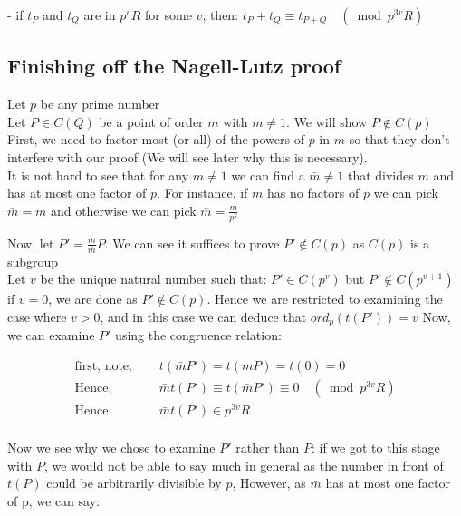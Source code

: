 \documentclass{article}
\begin{document}
- if $t_P$ and $t_Q$ are in $p^v R$ for some $v$, then: $t_P + t_Q  \equiv t_{P+Q} \quad (\bmod{p^{3v}R})$

\subsection{Finishing off the Nagell-Lutz proof}

Let $p$ be any prime number\\

Let $P \in C(Q)$ be a point of order $m$ with $m \neq 1$. We will show $P \notin C(p)$ \\

First, we need to factor most (or all) of the powers of $p$ in $m$ so that they don't interfere with our proof (We will see later why this is necessary).\\

It is not hard to see that for any $m \neq 1$ we can find a $\bar{m} \neq 1$ that divides $m$ and has at most one factor of $p$. For instance, if $m$ has no factors of $p$ we can pick $\bar{m} = m$ and otherwise we can pick $\bar{m} = \frac{m}{p^k}$

Now, let $P' = \frac{m}{\bar{m}} P$. We can see it suffices to prove $P' \notin C(p)$ as $C(p)$ is a subgroup\\

Let $v$ be the unique natural number such that: $P' \in C(p^v)$ but $P' \notin C(p^{v+1})$ \\

if $v = 0$, we are done as $P' \notin C(p)$. Hence we are restricted to examining the case where $v > 0$, and in this case we can deduce that $ord_p(t(P')) = v$ Now, we can examine $P'$ using the congruence relation:

\begin{align*}
    \text{first, note; } \quad & t(\bar{m}P') = t(mP) = t(0) = 0 \\
    \text{Hence, } \quad & \bar{m}t(P') \equiv t(\bar{m}P') \equiv 0 \quad (\bmod{p^{3v}R}) \\
    \text{Hence } \quad & \bar{m}t(P') \in p^{3v}R \\
\end{align*}

Now we see why we chose to examine $P'$ rather than $P$: if we got to this stage with $P$, we would not be able to say much in general as the number in front of $t(P)$ could be arbitrarily divisible by $p$, However, as $\bar{m}$ has at most one factor of p, we can say:
\end{document}
